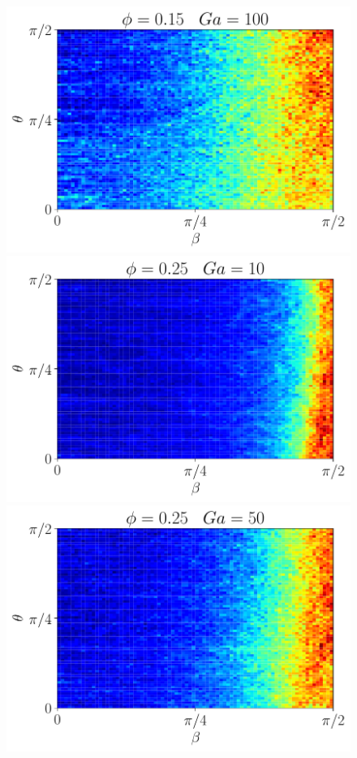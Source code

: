 \begin{figure}[h!]
    \includegraphics[height =\size]{image/N_10/beta/2DMAP_beta_theta_dmin_10_Bo0_5PHI0_15mu_r0_042Ga100.pdf}
    \includegraphics[height =\size]{image/N_10/beta/2DMAP_beta_theta_dmin_10_Bo0_5PHI0_25mu_r0_042Ga10.pdf}
    \includegraphics[height =\size]{image/N_10/beta/2DMAP_beta_theta_dmin_10_Bo0_5PHI0_25mu_r0_042Ga50.pdf}

\end{figure}
